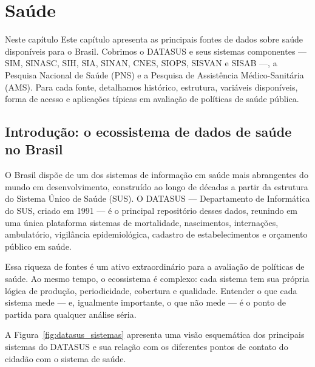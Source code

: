 
\chapter{Saúde}

\begin{boxdestaque}{Neste capítulo}
Este capítulo apresenta as principais fontes de dados sobre saúde disponíveis para o Brasil. Cobrimos o DATASUS e seus sistemas componentes --- SIM, SINASC, SIH, SIA, SINAN, CNES, SIOPS, SISVAN e SISAB ---, a Pesquisa Nacional de Saúde (PNS) e a Pesquisa de Assistência Médico-Sanitária (AMS). Para cada fonte, detalhamos histórico, estrutura, variáveis disponíveis, forma de acesso e aplicações típicas em avaliação de políticas de saúde pública.
\end{boxdestaque}

\section{Introdução: o ecossistema de dados de saúde no Brasil}

O Brasil dispõe de um dos sistemas de informação em saúde mais abrangentes do mundo em desenvolvimento, construído ao longo de décadas a partir da estrutura do Sistema Único de Saúde (SUS). O DATASUS --- Departamento de Informática do SUS, criado em 1991 --- é o principal repositório desses dados, reunindo em uma única plataforma sistemas de mortalidade, nascimentos, internações, ambulatório, vigilância epidemiológica, cadastro de estabelecimentos e orçamento público em saúde.

Essa riqueza de fontes é um ativo extraordinário para a avaliação de políticas de saúde. Ao mesmo tempo, o ecossistema é complexo: cada sistema tem sua própria lógica de produção, periodicidade, cobertura e qualidade. Entender o que cada sistema mede --- e, igualmente importante, o que não mede --- é o ponto de partida para qualquer análise séria.

A Figura~\ref{fig:datasus_sistemas} apresenta uma visão esquemática dos principais sistemas do DATASUS e sua relação com os diferentes pontos de contato do cidadão com o sistema de saúde.

